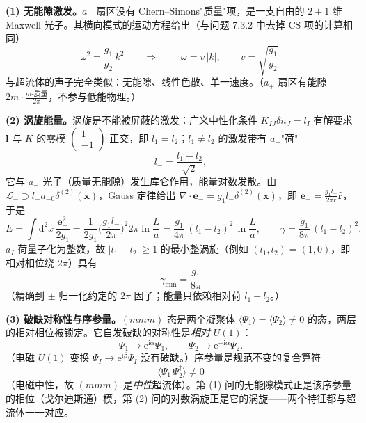 \textbf{(1) 无能隙激发。}$a_-$ 扇区没有 Chern--Simons"质量"项，是一支自由的 $2+1$ 维 Maxwell 光子。其横向模式的运动方程给出（与问题 7.3.2 中去掉 CS 项的计算相同）
\begin{equation*}
\omega^2=\frac{g_1}{g_2}\,k^2
\qquad\Longrightarrow\qquad
\boxed{\;\omega=v\,|k|,\qquad v=\sqrt{\frac{g_1}{g_2}}\;}
\end{equation*}
与超流体的声子完全类似：无能隙、线性色散、单一速度。（$a_+$ 扇区有能隙 $2m\cdot\frac{m\text{-质量}}{2\pi}$，不参与低能物理。）

\textbf{(2) 涡旋能量。}涡旋是不能被屏蔽的激发：广义中性化条件 $K_{IJ}\delta n_J=l_I$ 有解要求 $\pmb{l}$ 与 $K$ 的零模 $\begin{pmatrix}1\\-1\end{pmatrix}$ 正交，即 $l_1=l_2$；$l_1\neq l_2$ 的激发带有 $a_-$"荷"
\begin{equation*}
l_-=\frac{l_1-l_2}{\sqrt2},
\end{equation*}
它与 $a_-$ 光子（质量无能隙）发生库仑作用，能量对数发散。由 $\mathcal{L}_-\supset l_-a_{-0}\delta^{(2)}(\pmb{x})$，Gauss 定律给出
$\nabla\cdot\pmb{e}_-=g_1l_-\delta^{(2)}(\pmb{x})$，即 $\pmb{e}_-=\frac{g_1l_-}{2\pi r}\hat{\pmb r}$，于是
\begin{equation*}
E=\int\mathrm{d}^2x\,\frac{\pmb{e}_-^2}{2g_1}
=\frac{1}{2g_1}\Big(\frac{g_1l_-}{2\pi}\Big)^{2}2\pi\ln\frac{L}{a}
=\frac{g_1}{4\pi}\,(l_1-l_2)^2\,\ln\frac{L}{a},
\qquad
\gamma=\frac{g_1}{8\pi}\,(l_1-l_2)^2 .
\end{equation*}
$a_I$ 荷量子化为整数，故 $|l_1-l_2|\geqslant1$ 的最小整涡旋（例如 $(l_1,l_2)=(1,0)$，即相对相位绕 $2\pi$）具有
\begin{equation*}
\boxed{\;\gamma_{\min}=\frac{g_1}{8\pi}\;}
\end{equation*}
（精确到 $\pm$ 归一化约定的 $2\pi$ 因子；能量只依赖相对荷 $l_1-l_2$。）

\textbf{(3) 破缺对称性与序参量。}$(mmm)$ 态是两个凝聚体 $\langle\Psi_1\rangle=\langle\Psi_2\rangle\neq0$ 的态，两层的相对相位被锁定。它自发破缺的对称性是\emph{相对} $U(1)$：
\begin{equation*}
\Psi_1\to\mathrm{e}^{\mathrm{i}\alpha}\Psi_1,\qquad
\Psi_2\to\mathrm{e}^{-\mathrm{i}\alpha}\Psi_2 .
\end{equation*}
（电磁 $U(1)$ 变换 $\Psi_I\to\mathrm{e}^{\mathrm{i}\beta}\Psi_I$ 没有破缺。）序参量是规范不变的复合算符
\begin{equation*}
\boxed{\;\big\langle\Psi_1\,\Psi_2^{\dagger}\big\rangle\neq0\;}
\end{equation*}
（电磁中性，故 $(mmm)$ 是\emph{中性}超流体）。第 (1) 问的无能隙模式正是该序参量的相位（戈尔迪斯通）模，第 (2) 问的对数涡旋正是它的涡旋——两个特征都与超流体一一对应。

